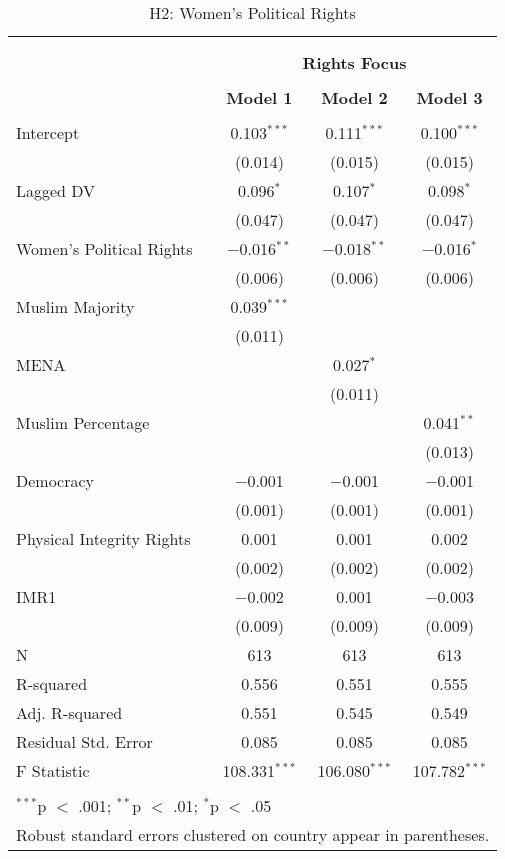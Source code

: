 
\begin{table}[!htbp] \centering 
  \caption{H2: Women's Political Rights} 
  \label{} 
\begin{tabular}{@{\extracolsep{5pt}}lccc} 
\\[-1.8ex]\hline \\[-1.8ex] 
\\[-1.8ex] & \multicolumn{3}{c}{\textbf{Rights Focus}} \\ 
\\[-1.8ex] & \textbf{Model 1} & \textbf{Model 2} & \textbf{Model 3}\\ 
\hline \\[-1.8ex] 
 Intercept & 0.103$^{***}$ & 0.111$^{***}$ & 0.100$^{***}$ \\ 
  & (0.014) & (0.015) & (0.015) \\ 
  Lagged DV & 0.096$^{*}$ & 0.107$^{*}$ & 0.098$^{*}$ \\ 
  & (0.047) & (0.047) & (0.047) \\ 
  Women's Political Rights & $-$0.016$^{**}$ & $-$0.018$^{**}$ & $-$0.016$^{*}$ \\ 
  & (0.006) & (0.006) & (0.006) \\ 
  Muslim Majority & 0.039$^{***}$ &  &  \\ 
  & (0.011) &  &  \\ 
  MENA &  & 0.027$^{*}$ &  \\ 
  &  & (0.011) &  \\ 
  Muslim Percentage &  &  & 0.041$^{**}$ \\ 
  &  &  & (0.013) \\ 
  Democracy & $-$0.001 & $-$0.001 & $-$0.001 \\ 
  & (0.001) & (0.001) & (0.001) \\ 
  Physical Integrity Rights & 0.001 & 0.001 & 0.002 \\ 
  & (0.002) & (0.002) & (0.002) \\ 
  IMR1 & $-$0.002 & 0.001 & $-$0.003 \\ 
  & (0.009) & (0.009) & (0.009) \\ 
 N & 613 & 613 & 613 \\ 
R-squared & 0.556 & 0.551 & 0.555 \\ 
Adj. R-squared & 0.551 & 0.545 & 0.549 \\ 
Residual Std. Error & 0.085 & 0.085 & 0.085 \\ 
F Statistic & 108.331$^{***}$ & 106.080$^{***}$ & 107.782$^{***}$ \\ 
\hline \\[-1.8ex] 
\multicolumn{4}{l}{$^{***}$p $<$ .001; $^{**}$p $<$ .01; $^{*}$p $<$ .05} \\ 
\multicolumn{4}{l}{Robust standard errors clustered on country appear in parentheses.} \\ 
\end{tabular} 
\end{table} 
